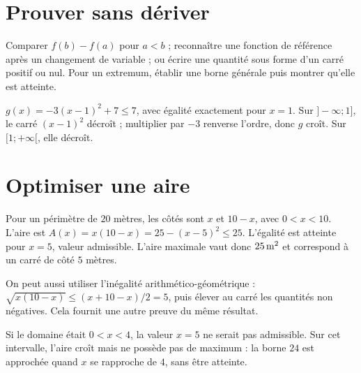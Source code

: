 \documentclass[../cours_2de.tex]{subfiles}
\begin{document}
\section{Prouver sans dériver}
\begin{methode}
Comparer $f(b)-f(a)$ pour $a<b$ ; reconnaître une fonction de référence après un changement de variable ; ou écrire une quantité sous forme d'un carré positif ou nul.
Pour un extremum, établir une borne générale puis montrer qu'elle est atteinte.
\end{methode}
\begin{exemple}
$g(x)=-3(x-1)^2+7\leq7$, avec égalité exactement pour $x=1$.
Sur $]-\infty;1]$, le carré $(x-1)^2$ décroît ; multiplier par $-3$ renverse l'ordre, donc $g$ croît. Sur $[1;+\infty[$, elle décroît.
\end{exemple}
\section{Optimiser une aire}
\begin{exemple}
Pour un périmètre de $20$ mètres, les côtés sont $x$ et $10-x$, avec $0<x<10$.
L'aire est
$A(x)=x(10-x)=25-(x-5)^2\leq25$.
L'égalité est atteinte pour $x=5$, valeur admissible. L'aire maximale vaut donc $25\,\mathrm{m^2}$ et correspond à un carré de côté $5$ mètres.
\end{exemple}
On peut aussi utiliser l'inégalité arithmético-géométrique :
$\sqrt{x(10-x)}\leq(x+10-x)/2=5$, puis élever au carré les quantités non négatives.
Cela fournit une autre preuve du même résultat.
\begin{attention}
Si le domaine était $0<x<4$, la valeur $x=5$ ne serait pas admissible. Sur cet intervalle, l'aire croît mais ne possède pas de maximum : la borne $24$ est approchée quand $x$ se rapproche de $4$, sans être atteinte.
\end{attention}
\end{document}
